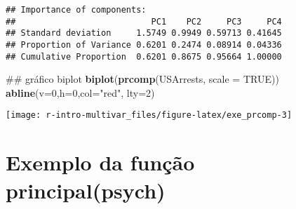 \documentclass[]{book}
\newenvironment{Shaded}{\begin{snugshade}}{\end{snugshade}}
\newcommand{\KeywordTok}[1]{\textcolor[rgb]{0.13,0.29,0.53}{\textbf{{#1}}}}
\newcommand{\DataTypeTok}[1]{\textcolor[rgb]{0.13,0.29,0.53}{{#1}}}
\newcommand{\DecValTok}[1]{\textcolor[rgb]{0.00,0.00,0.81}{{#1}}}
\newcommand{\StringTok}[1]{\textcolor[rgb]{0.31,0.60,0.02}{{#1}}}
\newcommand{\CommentTok}[1]{\textcolor[rgb]{0.56,0.35,0.01}{\textit{{#1}}}}
\newcommand{\OtherTok}[1]{\textcolor[rgb]{0.56,0.35,0.01}{{#1}}}
\newcommand{\NormalTok}[1]{{#1}}
\begin{document}
\begin{verbatim}
## Importance of components:
##                           PC1    PC2     PC3     PC4
## Standard deviation     1.5749 0.9949 0.59713 0.41645
## Proportion of Variance 0.6201 0.2474 0.08914 0.04336
## Cumulative Proportion  0.6201 0.8675 0.95664 1.00000
\end{verbatim}

\begin{Shaded}
\begin{Highlighting}[]
\NormalTok{## gráfico biplot}
\KeywordTok{biplot}\NormalTok{(}\KeywordTok{prcomp}\NormalTok{(USArrests, }\DataTypeTok{scale =} \OtherTok{TRUE}\NormalTok{))}
\KeywordTok{abline}\NormalTok{(}\DataTypeTok{v=}\DecValTok{0}\NormalTok{,}\DataTypeTok{h=}\DecValTok{0}\NormalTok{,}\DataTypeTok{col=}\StringTok{"red"}\NormalTok{, }\DataTypeTok{lty=}\DecValTok{2}\NormalTok{)}
\end{Highlighting}
\end{Shaded}

\begin{center}\texttt{[image: r-intro-multivar\_files/figure-latex/exe\_prcomp-3]} \end{center}

\section{Exemplo da função
principal(psych)}\label{exemplo-da-funcao-principalpsych}

\begin{Shaded}
\end{Shaded}
\end{document}

